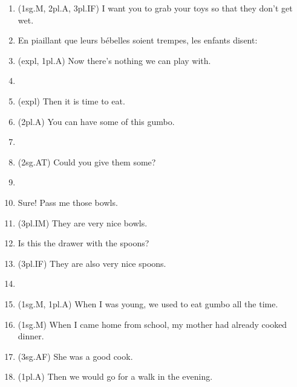 \begin{enumerate}
    \item (1sg.M, 2pl.A, 3pl.IF) I want you to grab your toys so that they don't get wet.
    \item En piaillant que leurs bébelles soient trempes, les enfants disent:\\
    \item (expl, 1pl.A) Now there's nothing we can play with.
    \item[] \\
    \item (expl) Then it is time to eat.
    \item (2pl.A) You can have some of this gumbo.
    \item[] \\
    \item (2sg.AT) Could you give them some?
    \item[] \\
    \item Sure! Pass me those bowls.
    \item (3pl.IM) They are very nice bowls.
    \item Is this the drawer with the spoons?
    \item (3pl.IF) They are also very nice spoons.
    \item[] \\
    \item (1sg.M, 1pl.A) When I was young, we used to eat gumbo all the time.
    \item (1sg.M) When I came home from school, my mother had already cooked dinner.
    \item (3sg.AF) She was a good cook.
    \item (1pl.A) Then we would go for a walk in the evening.
  \end{enumerate}
